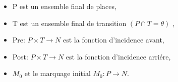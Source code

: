  \begin{itemize}
\item  	P est un ensemble final de places,
\item T est un ensemble final de transition $ (P \cap T = \theta ) $ ,
\item Pre: $P \times T \to N$ est la fonction d'incidence avant,
\item Post: $P \times T \to N$ est la fonction d'incidence arriére,
\item $M_{0}$ et le marquage initial $M_{0}:  P \to N$.
 

 \end{itemize}

    